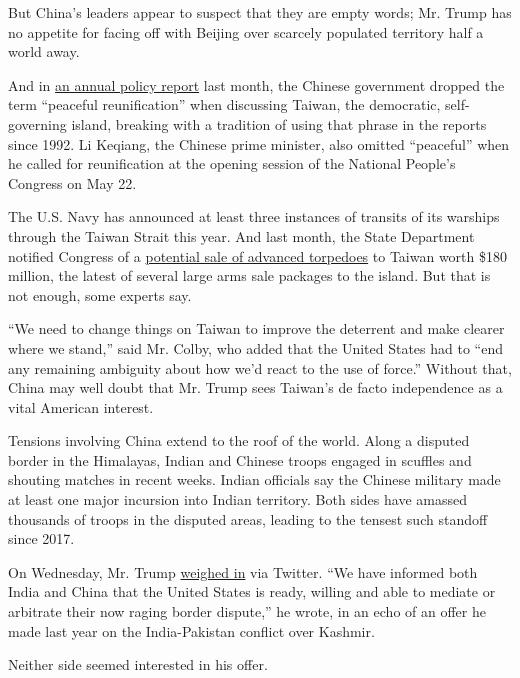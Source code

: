 But China's leaders appear to suspect that they are empty words; Mr.
Trump has no appetite for facing off with Beijing over scarcely
populated territory half a world away.

And in
\href{https://www.wsj.com/articles/china-breaks-with-taiwan-precedent-omitting-call-for-peaceful-unification-11590151372}{an
annual policy report} last month, the Chinese government dropped the
term ``peaceful reunification'' when discussing Taiwan, the democratic,
self-governing island, breaking with a tradition of using that phrase in
the reports since 1992. Li Keqiang, the Chinese prime minister, also
omitted ``peaceful'' when he called for reunification at the opening
session of the National People's Congress on May 22.

The U.S. Navy has announced at least three instances of transits of its
warships through the Taiwan Strait this year. And last month, the State
Department notified Congress of a
\href{https://www.reuters.com/article/us-taiwan-usa-security/us-to-sell-taiwan-180-million-worth-of-torpedoes-idUSKBN22X01N}{potential
sale of advanced torpedoes} to Taiwan worth \$180 million, the latest of
several large arms sale packages to the island. But that is not enough,
some experts say.

``We need to change things on Taiwan to improve the deterrent and make
clearer where we stand,'' said Mr. Colby, who added that the United
States had to ``end any remaining ambiguity about how we'd react to the
use of force.'' Without that, China may well doubt that Mr. Trump sees
Taiwan's de facto independence as a vital American interest.

Tensions involving China extend to the roof of the world. Along a
disputed border in the Himalayas, Indian and Chinese troops engaged in
scuffles and shouting matches in recent weeks. Indian officials say the
Chinese military made at least one major incursion into Indian
territory. Both sides have amassed thousands of troops in the disputed
areas, leading to the tensest such standoff since 2017.

On Wednesday, Mr. Trump
\href{https://twitter.com/realDonaldTrump/status/1265604027678670848?s=20}{weighed
in} via Twitter. ``We have informed both India and China that the United
States is ready, willing and able to mediate or arbitrate their now
raging border dispute,'' he wrote, in an echo of an offer he made last
year on the India-Pakistan conflict over Kashmir.

Neither side seemed interested in his offer.

